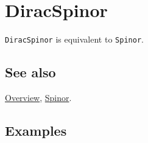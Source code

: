 \documentclass[../FeynCalcManual.tex]{subfiles}
\begin{document}
\hypertarget{diracspinor}{
\section{DiracSpinor}\label{diracspinor}}

\texttt{DiracSpinor} is equivalent to \texttt{Spinor}.

\subsection{See also}

\hyperlink{toc}{Overview}, \hyperlink{spinor}{Spinor}.

\subsection{Examples}
\end{document}
